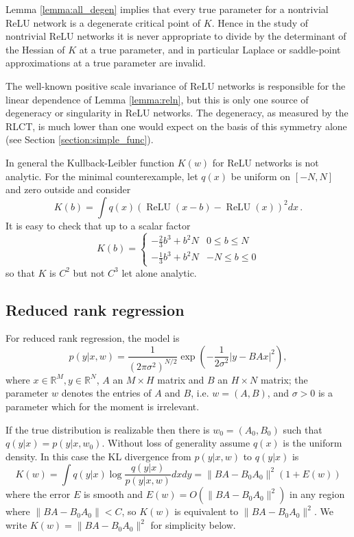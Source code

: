 \documentclass{article} %
\begin{document}
Lemma \ref{lemma:all_degen} implies that every true parameter for a nontrivial ReLU network is a degenerate critical point of $K$. Hence in the study of nontrivial ReLU networks it is never appropriate to divide by the determinant of the Hessian of $K$ at a true parameter, and in particular Laplace or saddle-point approximations at a true parameter are invalid.

The well-known positive scale invariance of ReLU networks is responsible for the linear dependence of Lemma \ref{lemma:reln}, but this is only one source of degeneracy or singularity in ReLU networks. The degeneracy, as measured by the RLCT, is much lower than one would expect on the basis of this symmetry alone (see Section \ref{section:simple_func}).

\begin{example}\label{example:not_analytic} In general the Kullback-Leibler function $K(w)$ for ReLU networks is not analytic. For the minimal counterexample, let $q(x)$ be uniform on $[-N, N]$ and zero outside and consider
\[
K(b) = \int q(x) ( \operatorname{ReLU}(x - b) - \operatorname{ReLU}(x) )^2 dx\,.
\]
It is easy to check that up to a scalar factor
\[
K(b) = \begin{cases} -\tfrac{2}{3} b^3 + b^2 N & 0 \le b \le N \\
-\tfrac{1}{3} b^3 + b^2 N & -N \le b \le 0
\end{cases}
\]
so that $K$ is $C^2$ but not $C^3$ let alone analytic.
\end{example}

\subsection{Reduced rank regression} \label{appendix:reducedrank}
For reduced rank regression, the model is
$$
p( y \rvert x, w) = \frac{1}{(2\pi \sigma^2)^{N/2}} \exp\left( -
\frac{1}{2 \sigma^2} | y - BA x|^2\right),
$$
where $x \in \mathbb{R}^M, y \in \mathbb{R}^N$, $A$ an $M \times H$
matrix and $B$ an $H \times N$ matrix; the parameter $w$ denotes the
entries of $A$ and $B$, i.e. $w = (A, B)$, and $\sigma > 0$ is a
parameter which for the moment is irrelevant.

If the true distribution is realizable then there is $w_0 = (A_0,
B_0)$ such that $q(y|x) = p(y \rvert x, w_0)$.  Without loss of generality assume $q(x)$ is the uniform density. In this case the KL
divergence from $p(y \rvert x, w)$ to $q(y|x)$ is
$$
K(w) = \int q(y|x) \log \frac{q(y|x)}{p(y|x, w)} dxdy = \| BA -
B_0A_0 \|^2 \left( 1 + E(w) \right)
$$
where the error $E$ is smooth and $E(w) = O(\| BA -
B_0A_0 \|^2)$ in any region where $\| BA -
B_0A_0 \| < C$, so $K(w)$ is equivalent to $\|BA - B_0 A_0\|^2$.  We
write $K(w) = \|BA - B_0 A_0\|^2$ for simplicity below.
\end{document}

